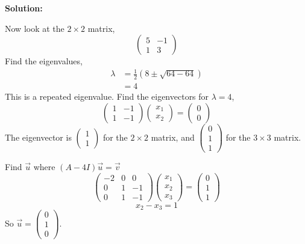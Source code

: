 \documentclass[12pt]{article}
\newenvironment{solution}{
    \textbf{Solution:}
    
}{
    
    \vspace{2em}
}
\begin{document}
\begin{solution}
    Now look at the \(2 \times 2\) matrix,
    \[
        \begin{pmatrix}
            5 & -1 \\
            1 & 3
        \end{pmatrix}
    \]
    Find the eigenvalues,
    \[
        \begin{aligned}
            \lambda &= \frac{1}{2}(8 \pm \sqrt{64 - 64}) \\
            &= 4
        \end{aligned}
    \]
    This is a repeated eigenvalue. Find the eigenvectors for \(\lambda = 4\),
    \[
        \begin{pmatrix}
            1 & -1 \\
            1 & -1
        \end{pmatrix} \begin{pmatrix} x_1 \\ x_2 \end{pmatrix} = \begin{pmatrix} 0 \\ 0 \end{pmatrix}
    \]
    The eigenvector is \(\begin{pmatrix} 1 \\ 1 \end{pmatrix}\) for the \(2 \times 2\) matrix, and \(\begin{pmatrix} 0 \\ 1 \\ 1 \end{pmatrix}\) for the \(3 \times 3\) matrix.

    Find \(\vec{u}\) where \((A - 4I)\vec{u} = \vec{v}\)
    \[
        \begin{pmatrix}
            -2 & 0 & 0 \\
            0 & 1 & -1 \\
            0 & 1 & -1
        \end{pmatrix} \begin{pmatrix} x_1 \\ x_2 \\ x_3 \end{pmatrix} = \begin{pmatrix} 0 \\ 1 \\ 1 \end{pmatrix}
    \]
    \[
        x_2 - x_3 = 1
    \]
    So \(\vec{u} = \begin{pmatrix} 0 \\ 1 \\ 0 \end{pmatrix}\).


\end{solution}
\end{document}
